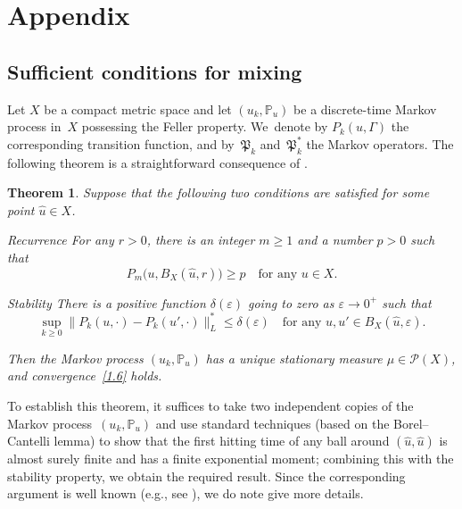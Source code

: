 \documentclass[11pt]{article}
\newcommand{\eg}{e.g.,\xspace}
\theoremstyle{plain}
\newtheorem{theorem}{Theorem}[section]
\theoremstyle{definition}
\newtheorem*{namedassumption}{\jepassumptionname}
\newenvironment{enonce*}[1]{\def\jepassumptionname{#1}\begin{namedassumption}}{\end{namedassumption}}
\let\mathcal\mathscr
\theoremstyle{plain}
\numberwithin{equation}{section}
\let\e\varepsilon
\newcommand{\IP}{{\mathbb P}}
\newcommand{\PP}{{\mathcal P}}
\newcommand{\PPPP}{{\mathfrak P}}
\begin{document}
\section{Appendix}\label{s5}
\subsection{Sufficient conditions for mixing}\label{s5.1}

Let $X$ be a compact metric space and let $(u_k,\IP_u)$ be a discrete-time Markov process
in~$X$ possessing the Feller property. We~denote by $P_k(u,\Gamma)$ the corresponding transition function, and by~$\PPPP_k$ and~$\PPPP_k^*$ the Markov operators. The following theorem is a straightforward consequence of \cite[Th.\,3.1.3]{KS-book}.

\begin{theorem} \label{t5.1}
Suppose that the following two conditions are satisfied for some point $\hat u\in X$.\vspace*{-.5\baselineskip}
\begin{enonce*}{Recurrence}
For any $r>0$, there is an integer $m\ge1$ and a number $p>0$ such that\vspace*{-5pt}
\begin{equation} \label{5.1}
P_m\bigl(u,B_X(\hat u,r)\bigr)\ge p\quad\text{for any $u\in X$}.
\end{equation}
\end{enonce*}
\begin{enonce*}{Stability}
There is a positive function $\delta(\e)$ going to zero as $\e\to0^+$ such that\vspace*{-3pt}
\begin{equation} \label{5.2}
\sup_{k\ge0}\|P_k(u,\cdot)-P_k(u',\cdot)\|_L^*\le\delta(\e)
\quad\text{for any $u,u'\in B_X(\hat u,\e)$}.
\end{equation}
\end{enonce*}
Then the Markov process $(u_k,\IP_u)$ has a unique stationary measure $\mu\in\PP(X)$,
and convergence~\eqref{1.6} holds.
\end{theorem}

To establish this theorem, it suffices to take two independent copies of the Markov process~$(u_k,\IP_u)$ and use standard techniques (based on the Borel--Cantelli lemma) to show that the first hitting time of any ball around $(\hat u,\hat u)$ is almost surely finite and has a finite exponential moment; combining this with the stability property, we obtain the required result. Since the corresponding argument is well known (\eg see \cite[\S3.3]{KS-book}), we do note give more details.
\end{document}
